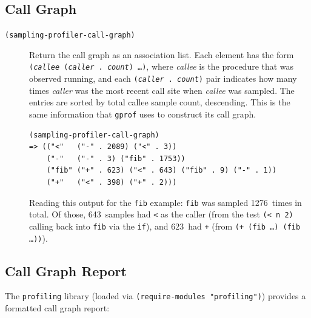 \subsection{Call Graph}

\begin{description}

\item[{\tt (sampling-profiler-call-graph)}]
  Return the call graph as an association list.  Each element has the
  form {\tt ({\it callee\/} ({\it caller\/}~.~{\it count\/}) \ldots)},
  where {\it callee\/} is the procedure that was observed running, and
  each {\tt ({\it caller\/}~.~{\it count\/})} pair indicates how many
  times {\it caller\/} was the most recent call site when {\it callee\/}
  was sampled.  The entries are sorted by total callee sample count,
  descending.  This is the same information that {\tt gprof} uses to
  construct its call graph.

\begin{lstlisting}[language={}]
(sampling-profiler-call-graph)
=> (("<"   ("-" . 2089) ("<" . 3))
    ("-"   ("-" . 3) ("fib" . 1753))
    ("fib" ("+" . 623) ("<" . 643) ("fib" . 9) ("-" . 1))
    ("+"   ("<" . 398) ("+" . 2)))
\end{lstlisting}

  Reading this output for the {\tt fib} example: {\tt fib} was sampled
  1276~times in total.  Of those, 643~samples had {\tt <} as the
  caller (from the test {\tt (< n 2)} calling back into {\tt fib} via
  the {\tt if}), and 623~had {\tt +} (from {\tt (+ (fib \ldots) (fib
  \ldots))}).

\end{description}

\subsection{Call Graph Report}

The {\tt profiling} library (loaded via {\tt (require-modules
"profiling")}) provides a formatted call graph report:

